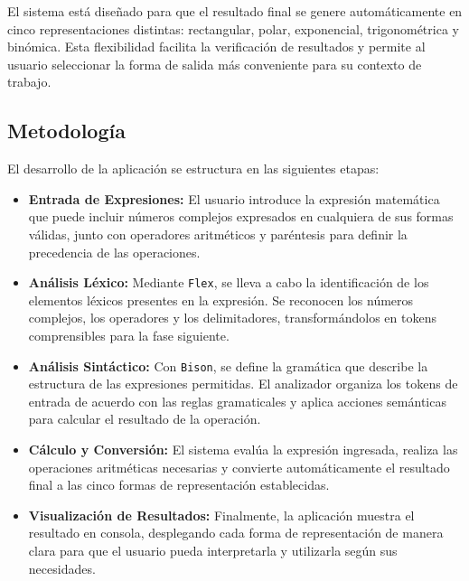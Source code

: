\documentclass{article}
\begin{document}
El sistema está diseñado para que el resultado final se genere automáticamente en cinco representaciones distintas: rectangular, polar, exponencial, trigonométrica y binómica. Esta flexibilidad facilita la verificación de resultados y permite al usuario seleccionar la forma de salida más conveniente para su contexto de trabajo.

\subsection{Metodología}
El desarrollo de la aplicación se estructura en las siguientes etapas:

\begin{itemize}
    \item \textbf{Entrada de Expresiones:} El usuario introduce la expresión matemática que puede incluir números complejos expresados en cualquiera de sus formas válidas, junto con operadores aritméticos y paréntesis para definir la precedencia de las operaciones.
    
    \item \textbf{Análisis Léxico:} Mediante \texttt{Flex}, se lleva a cabo la identificación de los elementos léxicos presentes en la expresión. Se reconocen los números complejos, los operadores y los delimitadores, transformándolos en tokens comprensibles para la fase siguiente.
    
    \item \textbf{Análisis Sintáctico:} Con \texttt{Bison}, se define la gramática que describe la estructura de las expresiones permitidas. El analizador organiza los tokens de entrada de acuerdo con las reglas gramaticales y aplica acciones semánticas para calcular el resultado de la operación.
    
    \item \textbf{Cálculo y Conversión:} El sistema evalúa la expresión ingresada, realiza las operaciones aritméticas necesarias y convierte automáticamente el resultado final a las cinco formas de representación establecidas.
    
    \item \textbf{Visualización de Resultados:} Finalmente, la aplicación muestra el resultado en consola, desplegando cada forma de representación de manera clara para que el usuario pueda interpretarla y utilizarla según sus necesidades.
\end{itemize}


\end{document}
